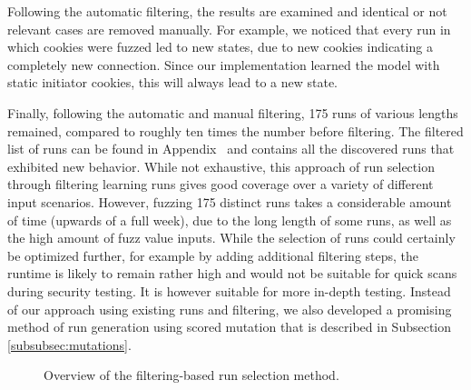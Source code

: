 Following the automatic filtering, the results are examined and identical or not relevant cases are removed manually. For example, we noticed that every run in which cookies were fuzzed led to new states, due to new cookies indicating a completely new connection. Since our implementation learned the model with static initiator cookies, this will always lead to a new state. 

Finally, following the automatic and manual filtering, 175 runs of various lengths remained, compared to roughly ten times the number before filtering. The filtered list of runs can be found in Appendix~ and contains all the discovered runs that exhibited new behavior. While not exhaustive, this approach of run selection through filtering learning runs gives good coverage over a variety of different input scenarios. However, fuzzing 175 distinct runs takes a considerable amount of time (upwards of a full week), due to the long length of some runs, as well as the high amount of fuzz value inputs. While the selection of runs could certainly be optimized further, for example by adding additional filtering steps, the runtime is likely to remain rather high and would not be suitable for quick scans during security testing. It is however suitable for more in-depth testing. Instead of our approach using existing runs and filtering, we also developed a promising method of run generation using scored mutation that is described in Subsection \ref{subsubsec:mutations}.

\begin{figure}
\begin{centering}
\caption{Overview of the filtering-based run selection method.}
\label{fig:fuzz_filtering}
\end{centering}
\end{figure}


